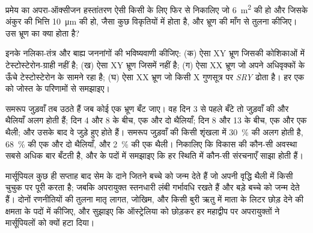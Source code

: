 \begin{exercise}[$\star\star$]\label{exo:b2:mammal-reproduction:9}
प्रमेय का अपरा-ऑक्सीजन हस्तांतरण ऐसी किसी
 के लिए फिर से निकालिए जो \qty{6}{m^2} की हो और जिसके अंकुर की
भित्ति \qty{10}{\micro m} की हो, जैसा कुछ विकृतियों में होता है, और भ्रूण
की माँग से तुलना कीजिए। उस भ्रूण का क्या होता है?
\end{exercise}

\begin{exercise}[$\star\star\star$]\label{exo:b2:mammal-reproduction:10}
इनके नलिका-तंत्र और बाह्य जननांगों की भविष्यवाणी कीजिए: (क) ऐसा XY
भ्रूण जिसकी कोशिकाओं में टेस्टोस्टेरोन-ग्राही नहीं है; (ख) ऐसा XY भ्रूण
जिसमें  नहीं है; (ग) ऐसा XX भ्रूण जो अपने
अधिवृक्कों के ऊँचे टेस्टोस्टेरोन के सामने रहा है; (घ) ऐसा XX भ्रूण जो
किसी X गुणसूत्र पर \emph{SRY} ढोता है। हर एक को जोस्त के परिणामों से समझाइए।
\end{exercise}

\begin{exercise}[$\star\star\star$]\label{exo:b2:mammal-reproduction:11}
समरूप जुड़वाँ तब उठते हैं जब कोई एक भ्रूण बँट जाए। वह दिन 3 से पहले
बँटे तो जुड़वाँ की  और थैलियाँ अलग होती हैं; दिन 4 और
8 के बीच, एक  और दो थैलियाँ; दिन 8 और 13 के बीच, एक  और
एक थैली; और उसके बाद वे जुड़े हुए होते हैं। समरूप जुड़वाँ की किसी शृंखला
में \qty{30}{\%} की  अलग होती है, \qty{68}{\%} की एक  और
दो थैलियाँ, और \qty{2}{\%} की एक थैली। निकालिए कि विकास की कौन-सी अवस्था
सबसे अधिक बार बँटती है, और  के पदों में समझाइए कि हर
स्थिति में कौन-सी संरचनाएँ साझा होती हैं।
\end{exercise}

\begin{exercise}[$\star\star\star$]\label{exo:b2:mammal-reproduction:12}
मार्सूपियल कुछ ही सप्ताह बाद सेम के दाने जितने बच्चे को जन्म देते हैं जो
अपनी वृद्धि थैली में किसी चुचुक पर पूरी करता है; जबकि अपरायुक्त स्तनधारी
लंबी गर्भावधि रखते हैं और बड़े बच्चे को जन्म देते हैं। दोनों
रणनीतियों की तुलना मातृ लागत, जोखिम, और किसी बुरी ऋतु में माता के
लिटर छोड़ देने की क्षमता के पदों में कीजिए, और सुझाइए कि ऑस्ट्रेलिया को
छोड़कर हर महाद्वीप पर अपरायुक्तों ने मार्सूपियलों को क्यों हटा दिया।
\end{exercise}

